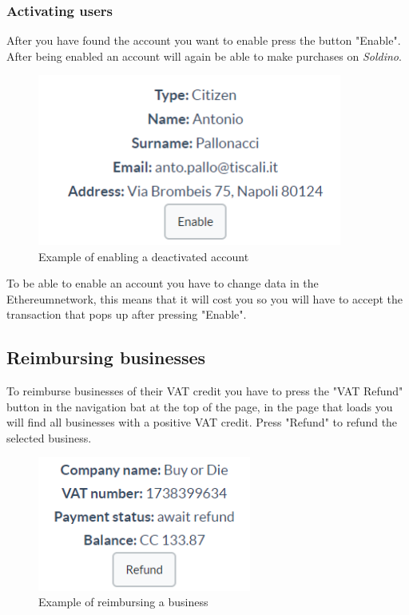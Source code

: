 		\subsubsection{Activating users}
		After you have found the account you want to enable press the button 
		"Enable". After being enabled an account will again be able to make 
		purchases on \textit{Soldino}.
		\begin{figure}[H]
			\includegraphics[width=10cm]{res/images/user_enable.png}
			\centering
			\caption{Example of enabling a deactivated account}
		\end{figure}
		\noindent To be able to enable an account you have to change 
		data in the Ethereum\glosp network, this means that it will 
		cost you so you will have to accept the transaction that pops
		up after pressing "Enable".
	\subsection{Reimbursing businesses}
	To reimburse businesses of their VAT credit you have to press the "VAT 
	Refund" button in the navigation bat at the top of the page, in the 
	page that loads you will find all businesses with a positive VAT credit.
	Press "Refund" to refund the selected business.
	\begin{figure}[H]
		\includegraphics[width=7cm]{res/images/business_refund.png}
		\centering
		\caption{Example of reimbursing a business}
	\end{figure}